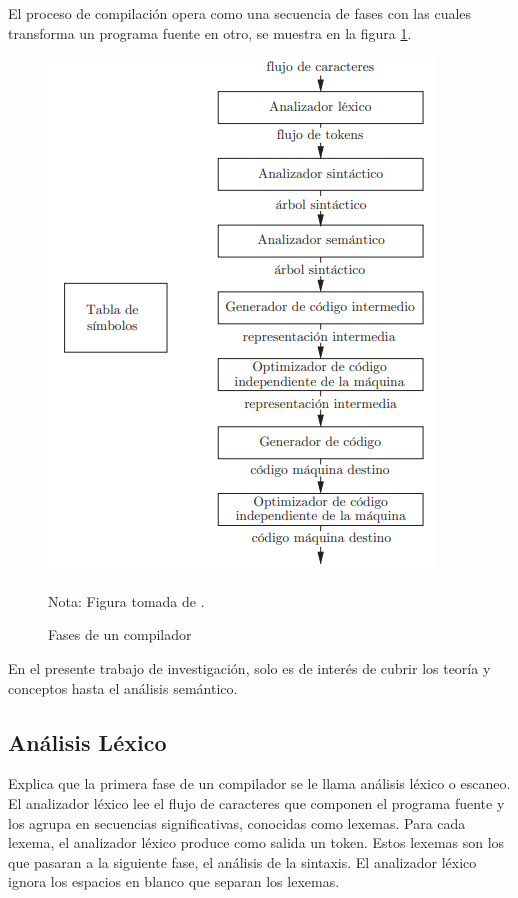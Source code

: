 El proceso de compilación opera como una secuencia de fases con las cuales transforma un programa fuente en otro, se muestra en la figura \ref{fasesCompilador1}.
\begin{figure}[ht!]
\centering
\includegraphics[scale=1]{imagenes/fasesCompilador1}
\caption{Fases de un compilador}
Nota: Figura tomada de \cite{aho2008compiladores}.
\label{fasesCompilador1}
\end{figure}

En el presente trabajo de investigación, solo es de interés de cubrir los teoría y conceptos hasta el análisis semántico.

\subsection{Análisis Léxico}
\cite{aho2008compiladores} Explica que la primera fase de un compilador se le llama análisis léxico o escaneo. El analizador léxico lee el flujo de caracteres que componen el programa fuente y los agrupa en secuencias significativas, conocidas como lexemas. Para cada lexema, el analizador léxico produce como salida un token. Estos lexemas son los que pasaran a la siguiente fase, el análisis de la sintaxis. El analizador léxico ignora los espacios en blanco que separan los lexemas.\\

